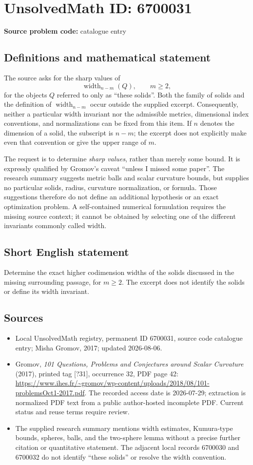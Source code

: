 \documentclass[11pt]{article}
\begin{document}
\section*{UnsolvedMath ID: 6700031}
\textbf{Source problem code:} catalogue entry
\subsection{Definitions and mathematical statement}
The source asks for the sharp values of
\[
\operatorname{width}_{n-m}(Q),\qquad m\geq2,
\]
for the objects \(Q\) referred to only as ``these solids''. Both the family of solids and the definition of \(\operatorname{width}_{n-m}\) occur outside the supplied excerpt. Consequently, neither a particular width invariant nor the admissible metrics, dimensional index conventions, and normalizations can be fixed from this item. If \(n\) denotes the dimension of a solid, the subscript is \(n-m\); the excerpt does not explicitly make even that convention or give the upper range of \(m\).

The request is to determine \emph{sharp values}, rather than merely some bound. It is expressly qualified by Gromov's caveat ``unless I missed some paper''. The research summary suggests metric balls and scalar curvature bounds, but supplies no particular solids, radius, curvature normalization, or formula. Those suggestions therefore do not define an additional hypothesis or an exact optimization problem. A self-contained numerical formulation requires the missing source context; it cannot be obtained by selecting one of the different invariants commonly called width.
\subsection{Short English statement}
Determine the exact higher codimension widths of the solids discussed in the missing surrounding passage, for \(m\geq2\). The excerpt does not identify the solids or define its width invariant.
\subsection{Sources}
\begin{itemize}
\item Local UnsolvedMath registry, permanent ID 6700031, source code catalogue entry; Misha Gromov, 2017; updated 2026-08-06.
\item Gromov, \emph{101 Questions, Problems and Conjectures around Scalar Curvature} (2017), printed tag [?31], occurrence 32, PDF page 42: \url{https://www.ihes.fr/~gromov/wp-content/uploads/2018/08/101-problemsOct1-2017.pdf}. The recorded access date is 2026-07-29; extraction is normalized PDF text from a public author-hosted incomplete PDF. Current status and reuse terms require review.
\item The supplied research summary mentions width estimates, Kumura-type bounds, spheres, balls, and the two-sphere lemma without a precise further citation or quantitative statement. The adjacent local records 6700030 and 6700032 do not identify ``these solids'' or resolve the width convention.
\end{itemize}
\end{document}
